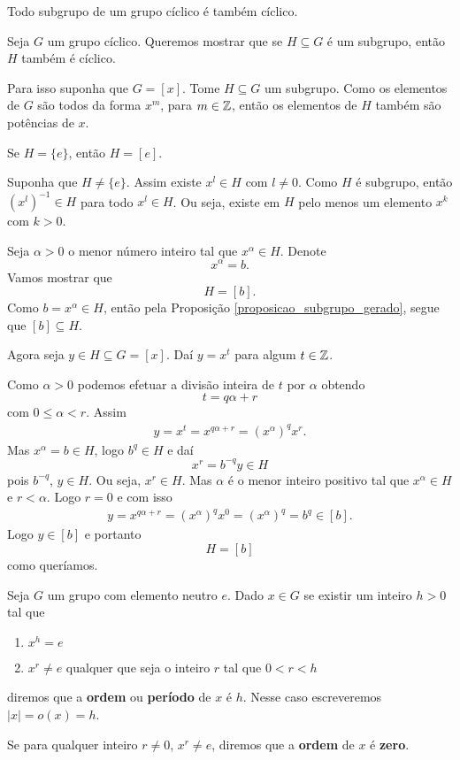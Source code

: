 \begin{proposicao}
    Todo subgrupo de um grupo cíclico é também cíclico.
\end{proposicao}
\begin{prova}
    Seja $G$ um grupo cíclico. Queremos mostrar que se $H \subseteq G$ é um subgrupo, então $H$ também é cíclico.

    Para isso suponha que $G = [x]$. Tome $H \subseteq G$ um subgrupo. Como os elementos de $G$ são todos da forma $x^m$, para $m \in \mathbb{Z}$, então os elementos de $H$ também são potências de $x$.

    Se $H = \{e\}$, então $H = [e]$.

    Suponha que $H \ne \{e\}$. Assim existe $x^l \in H$ com $l \ne 0$. Como $H$ é subgrupo, então $(x^l)^{-1} \in H$ para todo $x^l \in H$. Ou seja, existe em $H$ pelo menos um elemento $x^k$ com $k > 0$.

    Seja $\alpha > 0$ o menor n\'umero inteiro tal que $x^\alpha \in H$. Denote
    \[
        x^\alpha = b.
    \]
    Vamos mostrar que
    \[
        H = [b].
    \]
    Como $b = x^\alpha \in H$, então pela Proposição \eqref{proposicao_subgrupo_gerado}, segue que $[b] \subseteq H$.

    Agora seja $y \in H \subseteq G = [x]$. Daí $y = x^t$ para algum $t \in \mathbb{Z}$.

    Como $\alpha > 0$ podemos efetuar a divisão inteira de $t$ por $\alpha$ obtendo
    \[
        t = q\alpha + r
    \]
    com $0 \le \alpha < r$. Assim
    \begin{align*}
        y = x^t = x^{q\alpha + r} = (x^{\alpha})^qx^r.
    \end{align*}
    Mas $x^\alpha = b \in H$, logo $b^q \in H$ e daí
    \[
        x^r = b^{-q}y\in H
    \]
    pois $b^{-q}$, $y \in H$. Ou seja, $x^r \in H$. Mas $\alpha$ é o menor inteiro positivo tal que $x^\alpha \in H$ e $r < \alpha$. Logo $r = 0$ e com isso
    \begin{align*}
        y = x^{q\alpha + r} = (x^{\alpha})^qx^0 = (x^{\alpha})^q = b^q \in [b].
    \end{align*}
    Logo $y \in [b]$ e portanto
    \[
        H = [b]
    \]
    como queríamos.
\end{prova}

\begin{definicao}
    Seja $G$ um grupo com elemento neutro $e$. Dado $x \in G$ se existir um inteiro $h > 0$ tal que
    \begin{enumerate}[label={\roman*})]
        \item $x^h = e$
        \item $x^r \ne e$ qualquer que seja o inteiro $r$ tal que $0 < r < h$
    \end{enumerate}
    diremos que a \textbf{ordem} ou \textbf{período} de $x$ é $h$. Nesse caso escreveremos $|x| = o(x) = h$.

    Se para qualquer inteiro $r \ne 0$, $x^r \ne e$, diremos que a \textbf{ordem} de $x$ é \textbf{zero}.
\end{definicao}

